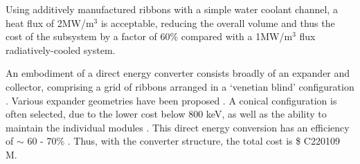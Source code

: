 Using additively manufactured ribbons with a simple water coolant channel, a heat flux of 2MW/m$^3$ is acceptable, reducing the overall volume and thus the cost of the subsystem by a factor of 60\% compared with a 1MW/m$^3$ flux radiatively-cooled system.\\


\begin{table}[h]
    \centering
    \caption{Cost Table}
    \label{tab:cost-table}
\end{table}

An embodiment of a direct energy converter consists broadly of an expander and collector, comprising a grid of ribbons arranged in a `venetian blind' configuration \cite{post1970mirror}. Various expander geometries have been proposed \cite{post1970mirror}. A conical configuration is often selected, due to the lower cost below 800 keV, as well as the ability to maintain the individual modules \cite{barr1974preliminary}. This direct energy conversion has an efficiency of $\sim$ 60 - 70\% \cite{moir1973venetian}.   Thus, with the converter structure, the total cost is \$ C220109 M.
